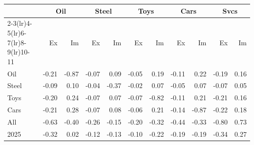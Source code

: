 \begin{tabular}{lrrrrrrrrrr}
\toprule
 & \multicolumn{2}{c}{Oil} & \multicolumn{2}{c}{Steel} & \multicolumn{2}{c}{Toys} & \multicolumn{2}{c}{Cars} & \multicolumn{2}{c}{Svcs} \\
\cmidrule(lr){2-3}\cmidrule(lr){4-5}\cmidrule(lr){6-7}\cmidrule(lr){8-9}\cmidrule(lr){10-11}
 & Ex & Im & Ex & Im & Ex & Im & Ex & Im & Ex & Im \\
\midrule
Oil & -0.21 & -0.87 & -0.07 & 0.09 & -0.05 & 0.19 & -0.11 & 0.22 & -0.19 & 0.16 \\
Steel & -0.09 & 0.10 & -0.04 & -0.37 & -0.02 & 0.07 & -0.05 & 0.07 & -0.07 & 0.05 \\
Toys & -0.20 & 0.24 & -0.07 & 0.07 & -0.07 & -0.82 & -0.11 & 0.21 & -0.21 & 0.16 \\
Cars & -0.21 & 0.28 & -0.07 & 0.08 & -0.06 & 0.21 & -0.14 & -0.87 & -0.22 & 0.18 \\
All & -0.63 & -0.40 & -0.26 & -0.15 & -0.20 & -0.32 & -0.44 & -0.33 & -0.80 & 0.73 \\
2025 & -0.32 & 0.02 & -0.12 & -0.13 & -0.10 & -0.22 & -0.19 & -0.19 & -0.34 & 0.27 \\
\bottomrule
\end{tabular}
